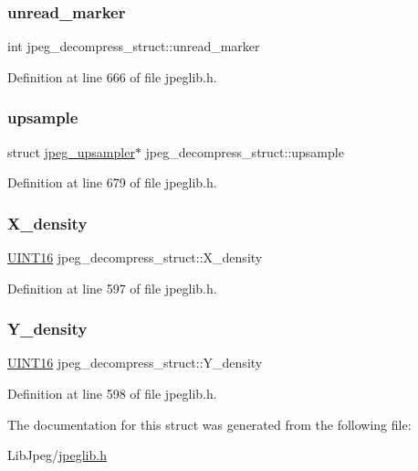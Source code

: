 \subsubsection{\texorpdfstring{unread\_marker}{unread\_marker}}
{\footnotesize\ttfamily int jpeg\+\_\+decompress\+\_\+struct\+::unread\+\_\+marker}



Definition at line 666 of file jpeglib.\+h.

\mbox{\label{structjpeg__decompress__struct_a80ad7e1c14488a065697b09679479c5d}} 
\subsubsection{\texorpdfstring{upsample}{upsample}}
{\footnotesize\ttfamily struct \mbox{\hyperlink{structjpeg__upsampler}{jpeg\+\_\+upsampler}}$\ast$ jpeg\+\_\+decompress\+\_\+struct\+::upsample}



Definition at line 679 of file jpeglib.\+h.

\mbox{\label{structjpeg__decompress__struct_a69f0da1031f16c621438d123921ba745}} 
\subsubsection{\texorpdfstring{X\_density}{X\_density}}
{\footnotesize\ttfamily \mbox{\hyperlink{jmorecfg_8h_a805c2c164bdd38d72a30c46e84fb568b}{U\+I\+N\+T16}} jpeg\+\_\+decompress\+\_\+struct\+::\+X\+\_\+density}



Definition at line 597 of file jpeglib.\+h.

\mbox{\label{structjpeg__decompress__struct_a2bfa78f638ae718f6601fd64a3b9f7aa}} 
\subsubsection{\texorpdfstring{Y\_density}{Y\_density}}
{\footnotesize\ttfamily \mbox{\hyperlink{jmorecfg_8h_a805c2c164bdd38d72a30c46e84fb568b}{U\+I\+N\+T16}} jpeg\+\_\+decompress\+\_\+struct\+::\+Y\+\_\+density}



Definition at line 598 of file jpeglib.\+h.



The documentation for this struct was generated from the following file\+:\begin{DoxyCompactItemize}
\item 
Lib\+Jpeg/\mbox{\hyperlink{jpeglib_8h}{jpeglib.\+h}}\end{DoxyCompactItemize}
